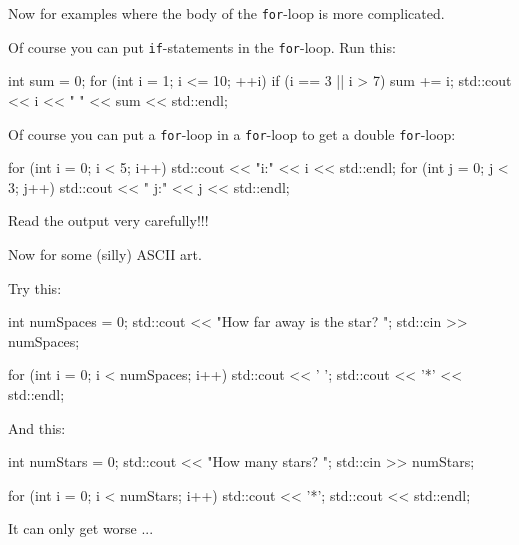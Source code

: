 \newpage{}

Now for examples where the body of the \texttt{for}-loop is more complicated.

Of course you can put \texttt{if}-statements in the \texttt{for}-loop. Run this:
\begin{console}
int sum = 0;
for (int i = 1; i <= 10; ++i)
{   
    if (i == 3 || i > 7)
    {
        sum += i;
        std::cout << i << " " << sum << std::endl;
    }
}
\end{console}



\newpage{}

Of course you can put a \texttt{for}-loop in a \texttt{for}-loop to get a double \texttt{for}-loop:
\begin{console}
for (int i = 0; i < 5; i++)
{   
    std::cout << "i:" << i << std::endl;
    for (int j = 0; j < 3; j++)
    {   
        std::cout << " j:" << j << std::endl;
    }
}
\end{console}
Read the output very carefully!!!




\newpage{}

Now for some (silly) ASCII art.

Try this:
\begin{console}
int numSpaces = 0;
std::cout << "How far away is the star? ";
std::cin >> numSpaces;

for (int i = 0; i < numSpaces; i++)
{   
    std::cout << ' ';
}
std::cout << '*' << std::endl;
\end{console}

And this:
\begin{console}
int numStars = 0;
std::cout << "How many stars? ";
std::cin >> numStars;

for (int i = 0; i < numStars; i++)
{   
    std::cout << '*';
}
std::cout << std::endl;
\end{console}

\newpage{}

It can only get worse ...

